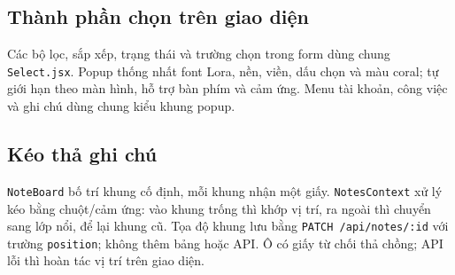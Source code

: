 \subsection{Thành phần chọn trên giao diện}
Các bộ lọc, sắp xếp, trạng thái và trường chọn trong form dùng chung
\texttt{Select.jsx}. Popup thống nhất font Lora, nền, viền, dấu chọn và màu coral;
tự giới hạn theo màn hình, hỗ trợ bàn phím và cảm ứng.
Menu tài khoản, công việc và ghi chú dùng chung kiểu khung popup.

\subsection{Kéo thả ghi chú}
\texttt{NoteBoard} bố trí khung cố định, mỗi khung nhận một giấy.
\texttt{NotesContext} xử lý kéo bằng chuột/cảm ứng: vào khung trống thì khớp vị trí,
ra ngoài thì chuyển sang lớp nổi, để lại khung cũ. Tọa độ khung lưu bằng
\texttt{PATCH /api/notes/:id} với trường \texttt{position}; không thêm bảng hoặc API.
Ô có giấy từ chối thả chồng; API lỗi thì hoàn tác vị trí trên giao diện.
